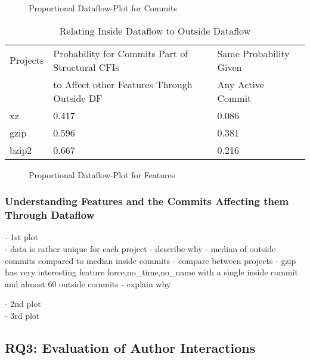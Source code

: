 \begin{figure}[htbp]
  \centering
  
  \caption{Proportional Dataflow-Plot for Commits}
  \label{fig:commit_dfbr_plot}
\end{figure}

\begin{table}[t]
\caption{Relating Inside Dataflow to Outside Dataflow}
\label{tab:commit_dfbr_rel_table}
\begin{tabular}{lll}
 Projects & Probability for Commits Part of Structural CFIs & Same Probability Given 	\\
 	  & to Affect other Features Through Outside DF     & Any Active Commit		\\
xz & 0.417 & 0.086 \\
gzip & 0.596 & 0.381 \\
bzip2 & 0.667 & 0.216 \\
\end{tabular}
\end{table}

\clearpage

\begin{figure}[htbp]
  \centering
  
  \caption{Proportional Dataflow-Plot for Features}
  \label{fig:feature_dfbr_plot}
\end{figure}

\clearpage

\subsubsection*{Understanding Features and the Commits Affecting them Through Dataflow}\label{sec:eval_feature_dfbr}

- 1st plot \\

- data is rather unique for each project
- describe why
- median of outside commits compared to median inside commits
- compare between projects
- gzip has very interesting feature force,no_time,no_name with a single inside commit and almost 60 outside commits
- explain why

- 2nd plot \\



- 3rd plot \\

\subsection*{\textbf{RQ3: Evaluation of Author Interactions}}\label{sec:eval_author_interactions}

